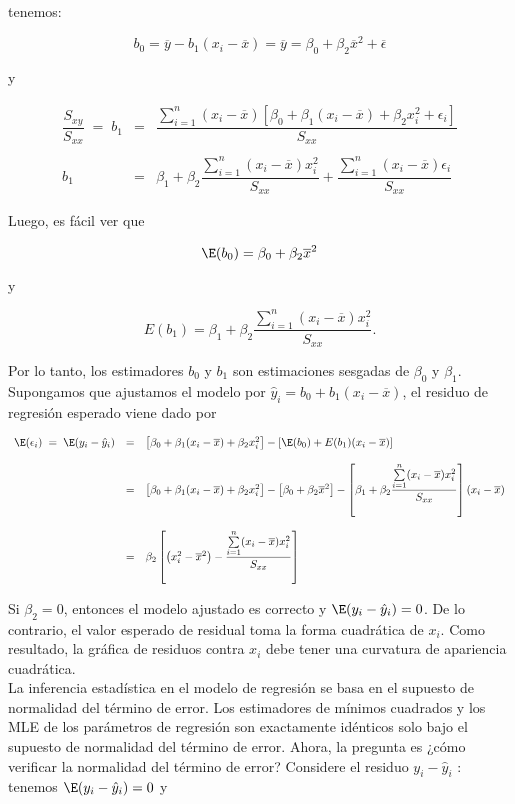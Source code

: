 tenemos:

$$b_0=\overline{y}-b_1(x_i-\overline{x})=\overline{y}=\beta_0+\beta_2\overline{x}^2+\overline{\epsilon}$$

y

$$
\begin{array}{rcl}
    \dfrac{S_{xy}}{S_{xx}}\; =\; b_1&=&\dfrac{\sum\limits_{i=1}^n(x_i-\overline{x})\left[\beta_0+\beta_1(x_i-\overline{x})+\beta_2x_i^2+\epsilon_i\right]}{S_{xx}}\\\\
    b_1 &=& \beta_1+\beta_2\dfrac{\sum\limits_{i=1}^n\left(x_i-\overline{x}\right)x_i^2}{S_{xx}}+\dfrac{\sum\limits_{i=1}^n\left(x_i-\overline{x}\right)\epsilon_i}{S_{xx}}
\end{array}
$$

Luego, es fácil ver que

$$\E(b_0)=\beta_0+\beta_2\overline{x}^2$$

y

$$E(b_1)=\beta_1+\beta_2\dfrac{\sum\limits_{i=1}^n\left(x_i-\overline{x}\right)x_i^2}{S_{xx}}.$$

Por lo tanto, los estimadores $b_0$ y $b_1$ son estimaciones sesgadas de $\beta_0$ y $\beta_1$. Supongamos que ajustamos el modelo por $\hat{y}_i=b_0+b_1(x_i-\overline{x})$, el residuo de regresión esperado viene dado por

$$
\begin{array}{rcl}
    \E(\epsilon_i) \; = \; \E(y_i-\hat{y}_i) &=& \left[\beta_0+\beta_1(x_i-\overline{x})+\beta_2x_i^2\right] - \left[\E(b_0)+E(b_1)(x_i-\overline{x})\right]\\\\
					     &=&\left[\beta_0+\beta_1(x_i-\overline{x})+\beta_2x_i^2\right] -  \left[\beta_0+\beta_2\overline{x}^2\right]-\left[\beta_1+\beta_2 \dfrac{\sum\limits_{i=1}^n(x_i-\overline{x})x_i^2}{S_{xx}}\right](x_i-\overline{x})\\\\
					     &=& \beta_2 \left[\left(x_i^2-\overline{x}^2\right)-\dfrac{\sum\limits_{i=1}^n(x_i-\overline{x})x_i^2}{S_{xx}}\right]
\end{array}
$$

Si $\beta_2=0$, entonces el modelo ajustado es correcto y $\E(y_i-\hat{y}_i)=0$. De lo contrario, el valor esperado de residual toma la forma cuadrática de $x_i$. Como resultado, la gráfica de residuos contra $x_i$ debe tener una curvatura de apariencia cuadrática.\\

La inferencia estadística en el modelo de regresión se basa en el supuesto de normalidad del término de error. Los estimadores de mínimos cuadrados y los MLE de los parámetros de regresión son exactamente idénticos solo bajo el supuesto de normalidad del término de error. Ahora, la pregunta es ¿cómo verificar la normalidad del término de error? Considere el residuo $y_i - \hat{y}_i$ : tenemos $\E(y_i - \hat{y}_i) = 0$ y

